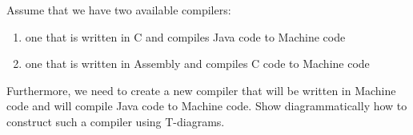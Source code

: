 \question Assume that we have two available compilers:
\begin{enumerate}
    \item one that is written in C and compiles Java code to Machine code
    \item one that is written in Assembly and compiles C code to Machine code
\end{enumerate}
Furthermore, we need to create a new compiler that will be written in Machine code and will compile Java code to 
Machine code. 
Show diagrammatically how to construct such a compiler using T-diagrams.
\begin{solution}
    \begin{center}
    \end{center}
\end{solution}

